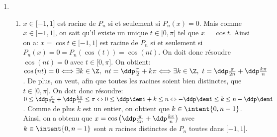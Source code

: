 \documentclass[a4paper, 11pt,reqno]{article}
\begin{document}
\begin{correction}
\begin{enumerate}
		      \begin{itemize}
			      \item[$\bullet$] On commence par calculer $Q(\cos{(t)})$ pour tout $t\in\R$. On a pour tout $t\in\R$:
			            $Q(\cos{(t)})=P_n( -\cos{t} )-(-1)^n P_n(\cos{t}) =P_n( \cos{(t+\pi)} ) -(-1)^n \cos{(nt)}  $ en utilisant le formulaire de trigonom\'etrie et la caract\'erisation de $P_n$ avec le cosinus. De plus, pour tout $t\in\R$, on a aussi: $P_n( \cos{(t+\pi)} )=\cos{(nt+n\pi)}=(-1)^n\cos{(nt)}$. Ainsi pour tout $t\in\R$: $Q(\cos{t})=0$.
			      \item[$\bullet$] Ainsi on a montr\'e que pour tout $x\in\lbrack -1,1\rbrack$, on a: $Q(x)=0$. En effet, on sait que lorsque $t$ parcourt $\R$, $\cos{t}$ parcourt $\lbrack -1,1\rbrack $. Ou encore on sait que la fonction cosinus est surjective de $\R$ dans $\lbrack -1,1\rbrack$ ce qui assure que pour tout $x\in\lbrack -1,1\rbrack$, il existe bien $t\in\R$ tel que $x=\cos{t}$. Si on veut l'unicit\'e du $t$, il faut prendre $t\in\lbrack 0,\pi\rbrack$ par exemple car la fonction cosinus est bijective de $\lbrack 0,\pi\rbrack$ dans $\lbrack -1,1\rbrack$. Comme pour tout $x\in\lbrack -1,1\rbrack$, on a: $Q(x)=0$, le polyn\^{o}me $Q$ a donc une infinit\'e de racines et ainsi $Q=0$.
			      \item[$\bullet$] On vient donc de montrer que: $P_n(-X)=(-1)^nP_n$. Ainsi si $n$ est pair, $P_n$ est une fonction paire, tandis que si $n$ est impair, $P_n$ est une fonction impaire ($\R$ est bien centr\'e en 0 et les polyn\^{o}mes sont des fonctions d\'efinies sur $\R$ tout entier).
		      \end{itemize}
		\item
		      \begin{enumerate}
			      \item $x\in\lbrack -1,1\rbrack$ est racine de $P_n$ si et seulement si $P_n(x)=0$. Mais comme $x\in\lbrack -1,1\rbrack$,
			            on sait qu'il existe un unique $t\in\lbrack 0,\pi\rbrack$ tel que $x=\cos{t}$. Ainsi on a: $x=\cos{t}\in\lbrack -1,1\rbrack$ est racine de $P_n$ si et seulement si $P_n(x)=0=P_n(\cos{(t)})=\cos{(nt)}$. On doit donc r\'esoudre $\cos{(nt)}=0$ avec $t\in\lbrack 0,\pi\rbrack$. On obtient: $\cos{(nt)}=0 \Longleftrightarrow \exists k\in\Z,\ nt=\ddp\frac{\pi}{2}+k\pi\Longleftrightarrow
				            \exists k\in\Z,\ t=\ddp\frac{\pi}{2n}+\ddp\frac{k\pi}{n}$. De plus, on veut, afin que toutes les racines soient bien distinctes, que $t\in\lbrack 0,\pi\rbrack$. On doit donc r\'esoudre: $0\leq \ddp\frac{\pi}{2n}+\ddp\frac{k\pi}{n}\leq \pi\Leftrightarrow 0\leq \ddp\demi+k\leq n\Leftrightarrow -\ddp\demi \leq k\leq n-\ddp\demi$. Comme de plus $k$ est un entier, on obtient que $k\in\intent{ 0,n-1}$. Ainsi, on a obtenu que $x=\cos{\left(  \ddp\frac{\pi}{2n}+\ddp\frac{k\pi}{n} \right)}$ avec $k\in\intent{ 0,n-1}$ sont $n$ racines distinctes de $P_n$ toutes dans $\lbrack -1,1\rbrack$.

\end{enumerate}
\end{enumerate}
\end{correction}
\end{document}
